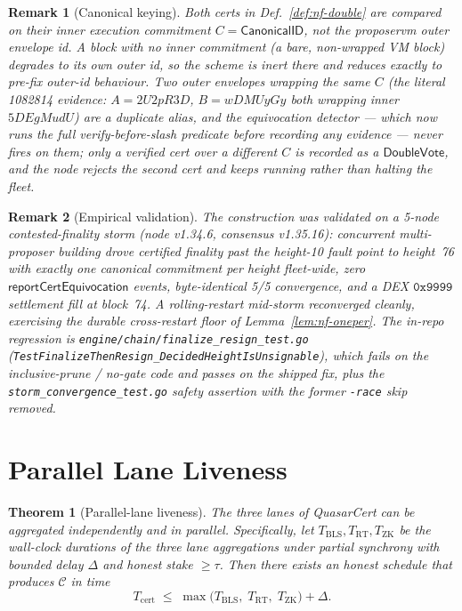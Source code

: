 \documentclass[11pt]{article}
\newtheorem{theorem}{Theorem}
\newtheorem{remark}{Remark}
\begin{document}
\begin{remark}[Canonical keying]
\label{rem:nf-canonical}
Both certs in Def.~\ref{def:nf-double} are compared on their inner
execution commitment $C = \mathsf{CanonicalID}$, not the proposervm
outer envelope id. A block with no inner commitment (a bare,
non-wrapped VM block) degrades to its own outer id, so the scheme is
inert there and reduces exactly to pre-fix outer-id behaviour. Two
outer envelopes wrapping the same $C$ (the literal 1082814 evidence:
$A=2U2pR3D$, $B=wDMUyGy$ both wrapping inner $5DEgMudU$) are a
\emph{duplicate alias}, and the equivocation detector --- which now runs
the full verify-before-slash predicate before recording any evidence ---
never fires on them; only a verified cert over a \emph{different} $C$ is
recorded as a $\mathsf{DoubleVote}$, and the node rejects the second
cert and keeps running rather than halting the fleet.
\end{remark}

\begin{remark}[Empirical validation]
\label{rem:nf-storm}
The construction was validated on a 5-node contested-finality storm
(node v1.34.6, consensus v1.35.16): concurrent multi-proposer building
drove certified finality past the height-10 fault point to height~76
with exactly one canonical commitment per height fleet-wide, zero
$\mathsf{reportCertEquivocation}$ events, byte-identical 5/5 convergence,
and a DEX $\mathtt{0x9999}$ settlement fill at block~74. A
rolling-restart \emph{mid-storm} reconverged cleanly, exercising the
durable cross-restart floor of Lemma~\ref{lem:nf-oneper}. The in-repo
regression is
\texttt{engine/chain/finalize\_resign\_test.go}
(\texttt{TestFinalizeThenResign\_DecidedHeightIsUnsignable}), which fails
on the inclusive-prune / no-gate code and passes on the shipped fix,
plus the \texttt{storm\_convergence\_test.go} safety assertion with the
former \texttt{-race} skip removed.
\end{remark}

\section{Parallel Lane Liveness}
\label{sec:parallel}

\begin{theorem}[Parallel-lane liveness]
\label{thm:parallel}
The three lanes of QuasarCert can be aggregated independently and in
parallel.  Specifically, let $T_{\mathrm{BLS}}, T_{\mathrm{RT}},
T_{\mathrm{ZK}}$ be the wall-clock durations of the three lane
aggregations under partial synchrony with bounded delay $\Delta$ and
honest stake $\geq \tau$.  Then there exists an honest schedule that
produces $\mathcal{C}$ in time
\[
  T_{\mathrm{cert}}
  \;\leq\;
  \max\!\bigl(T_{\mathrm{BLS}},\; T_{\mathrm{RT}},\; T_{\mathrm{ZK}}\bigr)
  + \Delta.
\]
\end{theorem}
\end{document}

